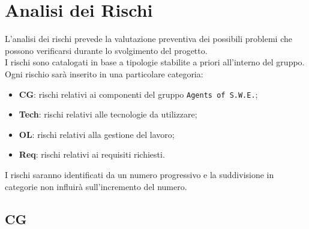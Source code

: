 \section{Analisi dei Rischi}

L'analisi dei rischi prevede la valutazione preventiva dei possibili problemi che possono verificarsi durante lo svolgimento del progetto. \\
I rischi sono catalogati in base a tipologie stabilite a priori all'interno del gruppo. 
Ogni rischio sarà inserito in una particolare categoria:
\begin{itemize}
\item \textbf{CG}: rischi relativi ai componenti del gruppo \texttt{Agents of S.W.E.};
\item \textbf{Tech}: rischi relativi alle tecnologie da utilizzare;
\item \textbf{OL}: rischi relativi alla gestione del lavoro;
\item \textbf{Req}: rischi relativi ai requisiti richiesti.  
\end{itemize}

I rischi saranno identificati da un numero progressivo e la suddivisione in categorie non influirà sull'incremento del numero. 

\subsection{CG}

